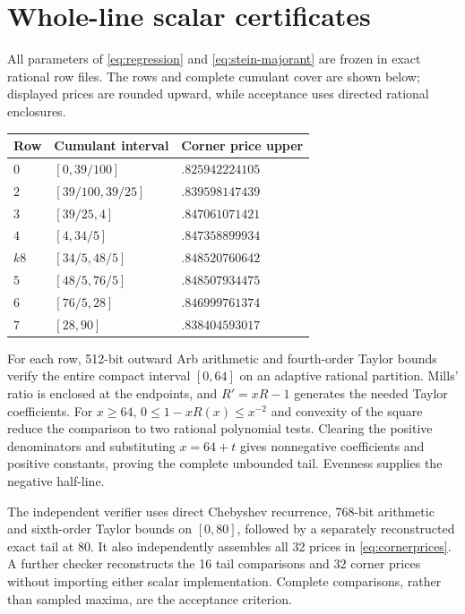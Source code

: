 \documentclass[11pt]{article}
\begin{document}
\section{Whole-line scalar certificates}\label{app:stein}
All parameters of \eqref{eq:regression} and \eqref{eq:stein-majorant}
are frozen in exact rational row files. The rows and complete cumulant
cover are shown below; displayed prices are rounded upward, while
acceptance uses directed rational enclosures.
\begin{center}\small
\begin{tabular}{lll}
Row & Cumulant interval & Corner price upper\\\hline
$0$ & $[0,39/100]$ & $.825942224105$\\
$2$ & $[39/100,39/25]$ & $.839598147439$\\
$3$ & $[39/25,4]$ & $.847061071421$\\
$4$ & $[4,34/5]$ & $.847358899934$\\
$k8$ & $[34/5,48/5]$ & $.848520760642$\\
$5$ & $[48/5,76/5]$ & $.848507934475$\\
$6$ & $[76/5,28]$ & $.846999761374$\\
$7$ & $[28,90]$ & $.838404593017$\\\hline
\end{tabular}
\end{center}
For each row, 512-bit outward Arb arithmetic and fourth-order Taylor
bounds verify the entire compact interval $[0,64]$ on an adaptive rational
partition. Mills' ratio is enclosed at the endpoints, and $R'=xR-1$
generates the needed Taylor coefficients.
For $x\ge64$, $0\le1-xR(x)\le x^{-2}$ and convexity of the square
reduce the comparison to two rational polynomial tests. Clearing the
positive denominators and substituting $x=64+t$ gives nonnegative
coefficients and positive constants, proving the complete unbounded tail.
Evenness supplies the negative half-line.

The independent verifier uses direct Chebyshev recurrence, 768-bit
arithmetic and sixth-order Taylor bounds on $[0,80]$, followed by a
separately reconstructed exact tail at 80. It also independently assembles
all 32 prices in \eqref{eq:cornerprices}. A further checker reconstructs
the 16 tail comparisons and 32 corner prices without importing either
scalar implementation. Complete comparisons, rather than sampled maxima,
are the acceptance criterion.
\end{document}

